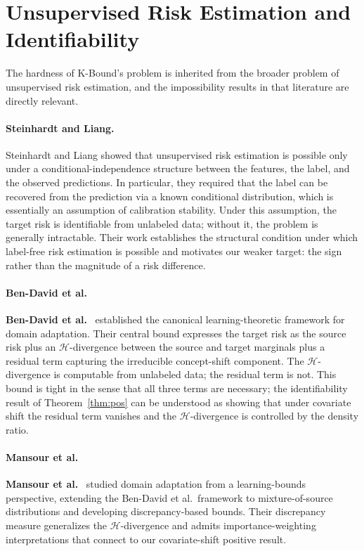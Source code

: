 \section{Unsupervised Risk Estimation and Identifiability}\label{sec:rel-ident}

The hardness of K-Bound's problem is inherited from the broader problem of
unsupervised risk estimation, and the impossibility results in that literature
are directly relevant.

\paragraph{Steinhardt and Liang.}
Steinhardt and Liang showed that unsupervised risk estimation is possible only
under a conditional-independence structure between the features, the label,
and the observed predictions.
In particular, they required that the label can be recovered from the
prediction via a known conditional distribution, which is essentially an
assumption of calibration stability.
Under this assumption, the target risk is identifiable from unlabeled data;
without it, the problem is generally intractable.
Their work establishes the structural condition under which label-free risk
estimation is possible and motivates our weaker target: the sign rather
than the magnitude of a risk difference.

\paragraph{Ben-David et al.}
\textbf{Ben-David et al.}~\cite{bendavid2010theory} established the canonical
learning-theoretic framework for domain adaptation.
Their central bound expresses the target risk as the source risk plus an
$\mathcal{H}$-divergence between the source and target marginals plus a
residual term capturing the irreducible concept-shift component.
The $\mathcal{H}$-divergence is computable from unlabeled data; the residual
term is not.
This bound is tight in the sense that all three terms are necessary; the
identifiability result of Theorem~\ref{thm:pos} can be understood as showing
that under covariate shift the residual term vanishes and the $\mathcal{H}$-divergence
is controlled by the density ratio.

\paragraph{Mansour et al.}
\textbf{Mansour et al.}~\cite{mansour2009domain} studied domain adaptation
from a learning-bounds perspective, extending the Ben-David et al.\ framework
to mixture-of-source distributions and developing discrepancy-based bounds.
Their discrepancy measure generalizes the $\mathcal{H}$-divergence and admits
importance-weighting interpretations that connect to our covariate-shift
positive result.

